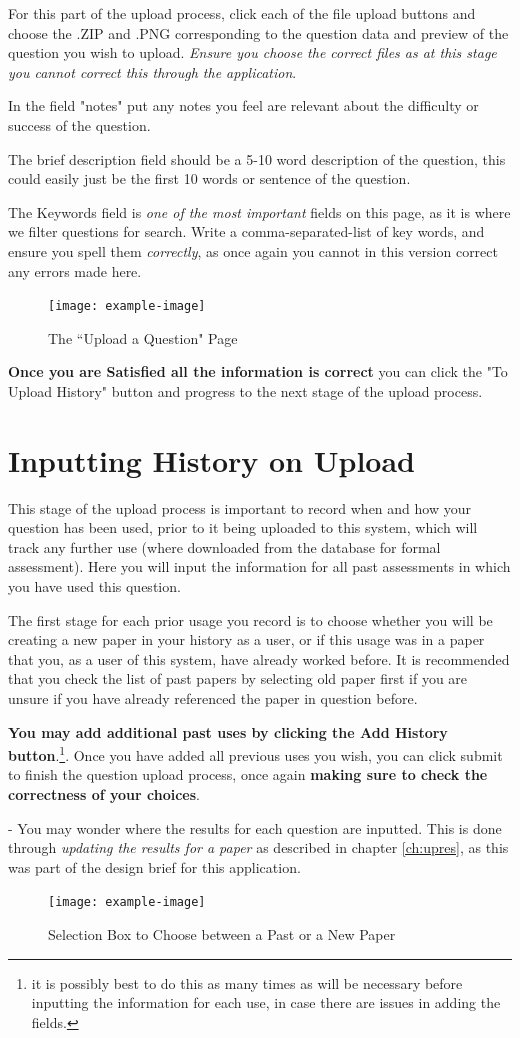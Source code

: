 \documentclass[12pt, a4paper, titlepage]{book}
\begin{document}
For this part of the upload process, click each of the file upload buttons and choose the .ZIP and .PNG corresponding to the question data and preview of the question you wish to upload. \textit{Ensure you choose the correct files as at this stage you cannot correct this through the application}.\par
In the field "notes" put any notes you feel are relevant about the difficulty or success of the question.\par The brief description field should be a 5-10 word description of the question, this could easily just be the first 10 words or sentence of the question.\par The Keywords field is \textit{one of the most important} fields on this page, as it is where we filter questions for search. Write a comma-separated-list of key words, and ensure you spell them \textit{correctly}, as once again you cannot in this version correct any errors made here.
\begin{figure}[H]
\centering
\texttt{[image: example-image]}
\label{fig:upload}
\caption{The ``Upload a Question" Page}
\end{figure}
\textbf{Once you are Satisfied all the information is correct} you can click the "To Upload History" button and progress to the next stage of the upload process.\pagebreak
\section{Inputting History on Upload}
This stage of the upload process is important to record when and how your question has been used, prior to it being uploaded to this system, which will track any further use (where downloaded from the database for formal assessment). Here you will input the information for all past assessments in which you have used this question.\par
The first stage for each prior usage you record is to choose whether you will be creating a new paper  in your history as a user, or if this usage was in a paper that you, as a user of this system, have already worked before. It is recommended that you check the list of past papers by selecting old paper first if you are unsure if you have already referenced the paper in question before. \par
\textbf{You may add additional past uses by clicking the Add History button}.\footnote{it is possibly best to do this as many times as will be necessary before inputting the information for each use, in case there are issues in adding the fields.}. Once you have added all previous uses you wish, you can click submit to finish the question upload process, once again \textbf{making sure to check the correctness of your choices}.
\par - You may wonder where the results for each question are inputted. This is done through \textit{updating the results for a paper} as described in chapter \ref{ch:upres}, as this was part of the design brief for this application.
\begin{figure}[htp]
\centering
\texttt{[image: example-image]}
\caption{Selection Box to Choose between a Past or a New Paper}
\end{figure}
\pagebreak
\end{document}

